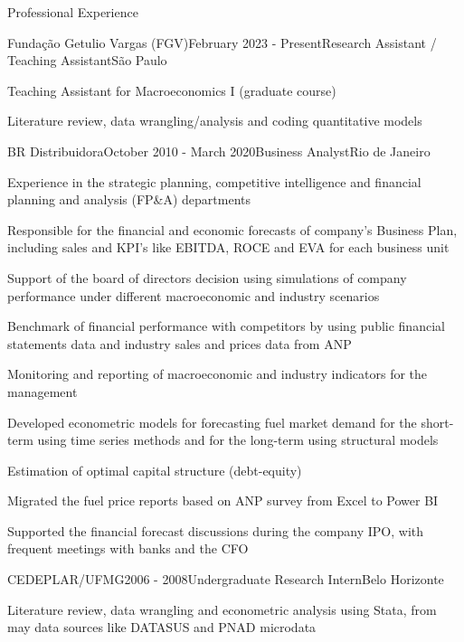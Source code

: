 \documentclass{resume}
\begin{document}
  
  \begin{rSection}{Professional Experience}
    
    \begin{rSubsection}{Fundação Getulio Vargas (FGV)}{February 2023 - Present}{Research Assistant / Teaching Assistant}{São Paulo}
      \item Teaching Assistant for Macroeconomics I (graduate course)
      \item Literature review, data wrangling/analysis and coding quantitative models
    \end{rSubsection}

    \begin{rSubsection}{BR Distribuidora}{October 2010 - March 2020}{Business Analyst}{Rio de Janeiro}
      \item Experience in the strategic planning, competitive intelligence and
      financial planning and analysis (FP\&A) departments
      \item Responsible for the financial and economic forecasts of company's
      Business Plan, including sales and KPI's like
      EBITDA, ROCE and EVA for each business unit
      \item Support of the board of directors decision using simulations of
      company performance under different macroeconomic and industry scenarios 
      \item Benchmark of financial performance with competitors by using public
      financial statements data and industry sales and prices data from ANP
      \item  Monitoring and reporting of macroeconomic and industry indicators
      for the management
      \item  Developed econometric models for forecasting fuel market demand
      for the short-term using time series methods 
      and for the long-term using structural models
      \item Estimation of optimal capital structure (debt-equity)
      \item  Migrated the fuel price reports based on ANP survey from Excel to
      Power BI
      \item  Supported the financial forecast discussions during the company
      IPO, with frequent meetings with banks and the CFO
    \end{rSubsection}
    
    
    \begin{rSubsection}{CEDEPLAR/UFMG}{2006 - 2008}{Undergraduate Research Intern}{Belo Horizonte}
      \item Literature review, data wrangling and econometric analysis using
      Stata, from may data sources like DATASUS and PNAD microdata
    \end{rSubsection}
  
  \end{rSection}
  
\end{document}
